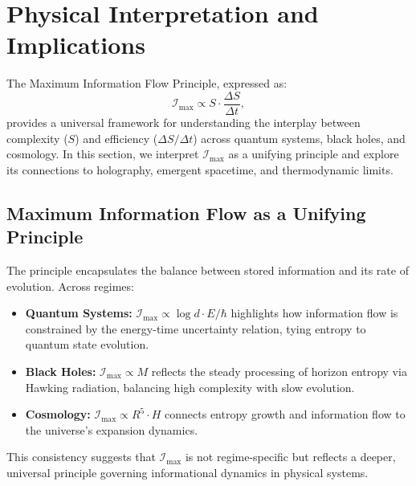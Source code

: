 \documentclass[12pt]{article}
\begin{document}
\section{Physical Interpretation and Implications}
\label{sec:implications}

The Maximum Information Flow Principle, expressed as:
\[
\mathcal{I}_{\text{max}} \propto S \cdot \frac{\Delta S}{\Delta t},
\]
provides a universal framework for understanding the interplay between complexity (\( S \)) and efficiency (\( \Delta S / \Delta t \)) across quantum systems, black holes, and cosmology. In this section, we interpret \( \mathcal{I}_{\text{max}} \) as a unifying principle and explore its connections to holography, emergent spacetime, and thermodynamic limits.

\subsection{Maximum Information Flow as a Unifying Principle}
The principle encapsulates the balance between stored information and its rate of evolution. Across regimes:
\begin{itemize}
    \item \textbf{Quantum Systems:} \( \mathcal{I}_{\text{max}} \propto \log d \cdot E / \hbar \) highlights how information flow is constrained by the energy-time uncertainty relation, tying entropy to quantum state evolution.
    \item \textbf{Black Holes:} \( \mathcal{I}_{\text{max}} \propto M \) reflects the steady processing of horizon entropy via Hawking radiation, balancing high complexity with slow evolution.
    \item \textbf{Cosmology:} \( \mathcal{I}_{\text{max}} \propto R^5 \cdot H \) connects entropy growth and information flow to the universe’s expansion dynamics.
\end{itemize}
This consistency suggests that \( \mathcal{I}_{\text{max}} \) is not regime-specific but reflects a deeper, universal principle governing informational dynamics in physical systems.
\end{document}
